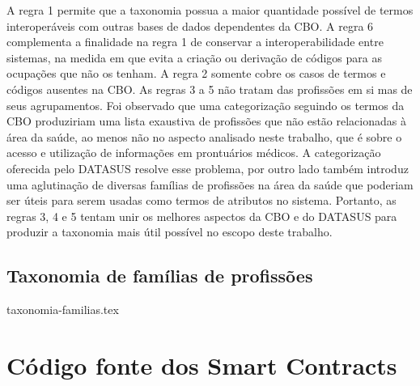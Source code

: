 \documentclass[a4paper,11pt]{article}
\begin{document}
A regra 1 permite que a taxonomia possua a maior quantidade possível de termos interoperáveis com outras bases de dados dependentes da CBO.
A regra 6 complementa a finalidade na regra 1 de conservar a interoperabilidade entre sistemas, na medida em que evita a criação ou derivação de códigos para as ocupações que não os tenham.
A regra 2 somente cobre os casos de termos e códigos ausentes na CBO.
As regras 3 a 5 não tratam das profissões em si mas de seus agrupamentos.
Foi observado que uma categorização seguindo os termos da CBO produziriam uma lista exaustiva de profissões que não estão relacionadas à área da saúde, ao menos não no aspecto analisado neste trabalho, que é sobre o acesso e utilização de informações em prontuários médicos.
A categorização oferecida pelo DATASUS resolve esse problema, por outro lado também introduz uma aglutinação de diversas famílias de profissões na área da saúde que poderiam ser úteis para serem usadas como termos de atributos no sistema.
Portanto, as regras 3, 4 e 5 tentam unir os melhores aspectos da CBO e do DATASUS para produzir a taxonomia mais útil possível no escopo deste trabalho.


\subsection{Taxonomia de famílias de profissões}

{taxonomia-familias.tex}

\newpage
\section{Código fonte dos Smart Contracts}
\label{app:codigoSmartContracts}
\end{document}
